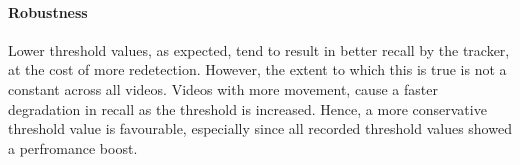 \paragraph{Robustness}
%     
Lower threshold values, as expected, tend to result in better recall by the tracker, at the cost of more redetection. However, the extent to which this is true is not a constant across all videos.
Videos with more movement, cause a faster degradation in recall as the threshold is increased. Hence, a more conservative threshold value is favourable, especially since all recorded threshold values 
showed a perfromance boost.
